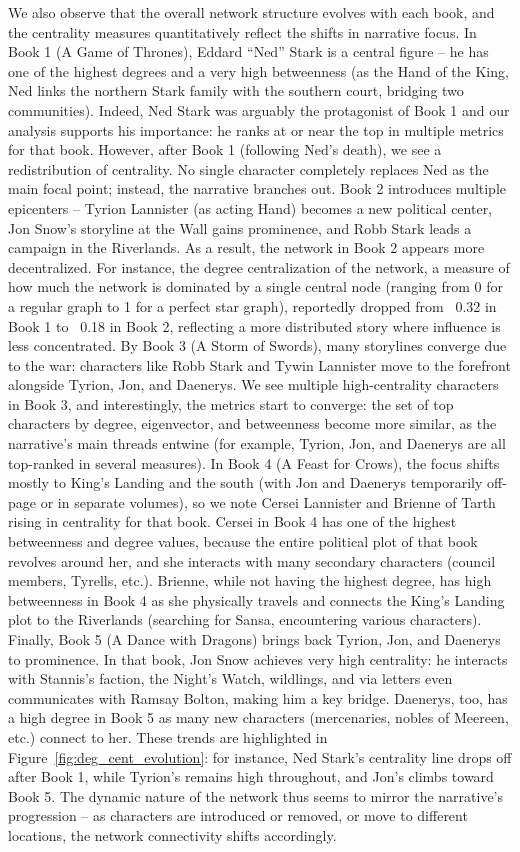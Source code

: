 \documentclass[12pt, a4paper]{article}
\begin{document}
We also observe that the overall network structure evolves with each book, and the centrality measures quantitatively reflect the shifts in narrative focus. In Book 1 (A Game of Thrones), Eddard ``Ned'' Stark is a central figure – he has one of the highest degrees and a very high betweenness (as the Hand of the King, Ned links the northern Stark family with the southern court, bridging two communities). Indeed, Ned Stark was arguably the protagonist of Book 1 and our analysis supports his importance: he ranks at or near the top in multiple metrics for that book. However, after Book 1 (following Ned's death), we see a redistribution of centrality. No single character completely replaces Ned as the main focal point; instead, the narrative branches out. Book 2 introduces multiple epicenters – Tyrion Lannister (as acting Hand) becomes a new political center, Jon Snow's storyline at the Wall gains prominence, and Robb Stark leads a campaign in the Riverlands. As a result, the network in Book 2 appears more decentralized. For instance, the degree centralization of the network, a measure of how much the network is dominated by a single central node (ranging from 0 for a regular graph to 1 for a perfect star graph), reportedly dropped from ~0.32 in Book 1 to ~0.18 in Book 2, reflecting a more distributed story where influence is less concentrated. By Book 3 (A Storm of Swords), many storylines converge due to the war: characters like Robb Stark and Tywin Lannister move to the forefront alongside Tyrion, Jon, and Daenerys. We see multiple high-centrality characters in Book 3, and interestingly, the metrics start to converge: the set of top characters by degree, eigenvector, and betweenness become more similar, as the narrative's main threads entwine (for example, Tyrion, Jon, and Daenerys are all top-ranked in several measures). In Book 4 (A Feast for Crows), the focus shifts mostly to King's Landing and the south (with Jon and Daenerys temporarily off-page or in separate volumes), so we note Cersei Lannister and Brienne of Tarth rising in centrality for that book. Cersei in Book 4 has one of the highest betweenness and degree values, because the entire political plot of that book revolves around her, and she interacts with many secondary characters (council members, Tyrells, etc.). Brienne, while not having the highest degree, has high betweenness in Book 4 as she physically travels and connects the King's Landing plot to the Riverlands (searching for Sansa, encountering various characters). Finally, Book 5 (A Dance with Dragons) brings back Tyrion, Jon, and Daenerys to prominence. In that book, Jon Snow achieves very high centrality: he interacts with Stannis's faction, the Night's Watch, wildlings, and via letters even communicates with Ramsay Bolton, making him a key bridge. Daenerys, too, has a high degree in Book 5 as many new characters (mercenaries, nobles of Meereen, etc.) connect to her. These trends are highlighted in Figure~\ref{fig:deg_cent_evolution}: for instance, Ned Stark's centrality line drops off after Book 1, while Tyrion's remains high throughout, and Jon's climbs toward Book 5. The dynamic nature of the network thus seems to mirror the narrative's progression – as characters are introduced or removed, or move to different locations, the network connectivity shifts accordingly.
\end{document}
